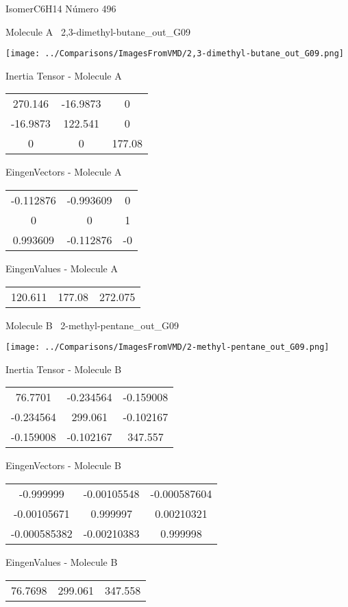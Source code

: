 \vtab[-3cm]
\begin{center}
{\large IsomerC6H14 \tab Número 496}
\end{center}
\begin{multicols}{2}
\begin{center}

Molecule A \
2,3-dimethyl-butane\_out\_G09

\texttt{[image: ../Comparisons/ImagesFromVMD/2,3-dimethyl-butane\_out\_G09.png]}

Inertia Tensor - Molecule A \\
\begin{tabular}{|c c c|}
270.146	 & 	-16.9873	 & 	0	 \\
-16.9873	 & 	122.541	 & 	0	 \\
0	 & 	0	 & 	177.08
\end{tabular}

\vtab
 EingenVectors - Molecule A     \\
\begin{tabular}{|c c c|}
-0.112876	 & 	-0.993609	 & 	0	 \\
0	 & 	0	 & 	1	 \\
0.993609	 & 	-0.112876	 & 	-0
\end{tabular}

\vtab
 EingenValues - Molecule A     \\
\begin{tabular}{|c c c|}
120.611	 & 	177.08	 & 	272.075	 \\
\end{tabular}
\columnbreak

Molecule B \
2-methyl-pentane\_out\_G09

\texttt{[image: ../Comparisons/ImagesFromVMD/2-methyl-pentane\_out\_G09.png]}

Inertia Tensor - Molecule B \\
\begin{tabular}{|c c c|}
76.7701	 & 	-0.234564	 & 	-0.159008	 \\
-0.234564	 & 	299.061	 & 	-0.102167	 \\
-0.159008	 & 	-0.102167	 & 	347.557
\end{tabular}

\vtab
 EingenVectors - Molecule B     \\
\begin{tabular}{|c c c|}
-0.999999	 & 	-0.00105548	 & 	-0.000587604	 \\
-0.00105671	 & 	0.999997	 & 	0.00210321	 \\
-0.000585382	 & 	-0.00210383	 & 	0.999998
\end{tabular}

\vtab
 EingenValues - Molecule B     \\
\begin{tabular}{|c c c|}
76.7698	 & 	299.061	 & 	347.558	 \\
\end{tabular}

\end{center}
\end{multicols}

